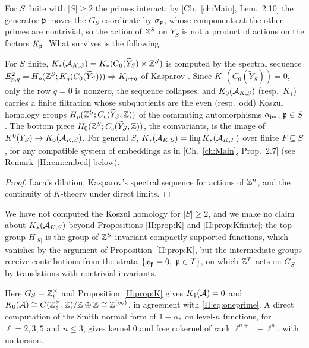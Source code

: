 For $S$ finite with $|S|\ge2$ the primes interact: by [Ch.~\ref{ch:Main}, Lem.~2.10] the generator
$\mathfrak{p}$ moves the $G_S$-coordinate by $\sigma_{\mathfrak{p}}$, whose components at the other primes are
nontrivial, so the action of $\mathbb{Z}^S$ on $\widetilde Y_S$ is not a product of actions on
the factors $K_{\mathfrak{p}}$. What survives is the following.

\begin{proposition}[Finite $S$]\label{II:prop:Kfinite}
For $S$ finite, $K_*(\mathcal{A}_{K,S})=K_*(C_0(\widetilde Y_S)\rtimes\mathbb{Z}^S)$ is computed by the
spectral sequence $E^2_{p,q}=H_p(\mathbb{Z}^S;K_q(C_0(\widetilde Y_S)))\Rightarrow K_{p+q}$ of
Kasparov \cite[\S6]{Kasparov}. Since $K_1(C_0(\widetilde Y_S))=0$, only the row $q=0$ is
nonzero, the sequence collapses, and $K_0(\mathcal{A}_{K,S})$ (resp.\ $K_1$) carries a finite
filtration whose subquotients are the even (resp.\ odd) Koszul homology groups
$H_p(\mathbb{Z}^S;C_c(\widetilde Y_S,\mathbb{Z}))$ of the commuting automorphisms $\alpha_{\mathfrak{p}*}$, $\mathfrak{p}\in S$.
The bottom piece $H_0(\mathbb{Z}^S;C_c(\widetilde Y_S,\mathbb{Z}))$, the coinvariants, is the image of
$K^0(Y_S)\to K_0(\mathcal{A}_{K,S})$. For general $S$, $K_*(\mathcal{A}_{K,S})=\varinjlim K_*(\mathcal{A}_{K,F})$
over finite $F\subseteq S$, for any compatible system of embeddings as in
[Ch.~\ref{ch:Main}, Prop.~2.7] (see Remark~\ref{II:rem:embed} below).
\end{proposition}

\begin{proof}
Laca's dilation, Kasparov's spectral sequence for actions of $\mathbb{Z}^n$, and the continuity of
$K$-theory under direct limits.
\end{proof}

We have not computed the Koszul homology for $|S|\ge2$, and we make no claim about
$K_*(\mathcal{A}_{K,S})$ beyond Propositions \ref{II:prop:K} and \ref{II:prop:Kfinite}; the top group
$H_{|S|}$ is the group of $\mathbb{Z}^S$-invariant compactly supported functions, which vanishes by
the argument of Proposition~\ref{II:prop:K}, but the intermediate groups receive contributions
from the strata $\{x_{\mathfrak{p}}=0,\ \mathfrak{p}\in T\}$, on which $\mathbb{Z}^T$ acts on $G_S$ by translations
with nontrivial invariants.

\begin{example}[$K=\Q$, $S=\{\ell\}$]\label{II:ex:oneprime}
Here $G_S=\mathbb{Z}_\ell^\times$ and Proposition~\ref{II:prop:K} gives $K_1(\mathcal{A})=0$ and
$K_0(\mathcal{A})\cong C(\mathbb{Z}_\ell^\times,\mathbb{Z})/\mathbb{Z}\oplus\mathbb{Z}\cong\mathbb{Z}^{(\infty)}$, in agreement with
\eqref{II:eq:oneprime}. A direct computation of the Smith normal form of $1-\alpha_*$ on
level-$n$ functions, for $\ell=2,3,5$ and $n\le3$, gives kernel $0$ and free cokernel of
rank $\ell^{n+1}-\ell^n$, with no torsion.
\end{example}

